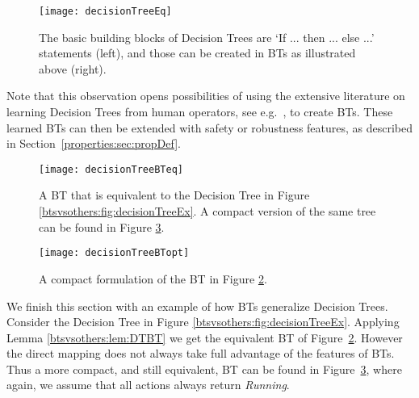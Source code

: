 \begin{figure}[htbp]
\begin{center}
\texttt{[image: decisionTreeEq]}
\caption{The basic building blocks of Decision Trees are `If ... then ... else ...' statements (left), and those can be created in BTs as illustrated above (right). }
\label{btsvsothers:fig:decisionTreeEq}
\end{center}
\end{figure}

Note that this observation opens possibilities of using the extensive literature on learning Decision Trees from human operators, see e.g.\ \cite{sammut20027}, to create BTs. These learned BTs can then be extended with safety or robustness  features, as described in Section~\ref{properties:sec:propDef}.




\begin{figure}[htbp]
\begin{center}
\texttt{[image: decisionTreeBTeq]}
\caption{A BT that is equivalent to the Decision Tree in Figure  \ref{btsvsothers:fig:decisionTreeEx}. 
A compact version of the same tree can be found in Figure \ref{btsvsothers:fig:decisionTreeBTopt}.
}
\label{btsvsothers:fig:decisionTreeBTeq}
\end{center}
\end{figure}

\begin{figure}[htbp]
\begin{center}
\texttt{[image: decisionTreeBTopt]}
\caption{A compact formulation of the BT in Figure  \ref{btsvsothers:fig:decisionTreeBTeq}. }
\label{btsvsothers:fig:decisionTreeBTopt}
\end{center}
\end{figure}


We finish this section with an example of how BTs generalize Decision Trees.
Consider the Decision Tree in Figure \ref{btsvsothers:fig:decisionTreeEx}. Applying Lemma \ref{btsvsothers:lem:DTBT} we get the equivalent BT of Figure~\ref{btsvsothers:fig:decisionTreeBTeq}. However the direct mapping does not always take full advantage of  the features of BTs. Thus a more compact, and still equivalent, BT can be found in Figure~\ref{btsvsothers:fig:decisionTreeBTopt}, where again, we assume that all actions always return \emph{Running}.







